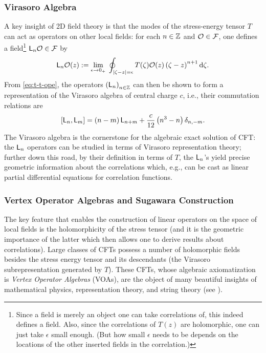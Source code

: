\documentclass[12pt,oneside,english]{amsart}
\numberwithin{equation}{section}
\numberwithin{figure}{section}
\theoremstyle{plain}
\theoremstyle{plain}
\theoremstyle{plain}
\theoremstyle{plain}
\theoremstyle{remark}
\theoremstyle{definition}
\theoremstyle{plain}
\theoremstyle{plain}
\numberwithin{thm}{section}
\begin{document}
\subsubsection{Virasoro Algebra}

A key insight of 2D field theory is that the modes of the stress-energy
tensor $T$ can act as operators on other local fields: for each $n\in\mathbb{Z} $
and ${\mathcal{O}}\in\mathcal{F}$, one defines a field\footnote{Since a field is 
merely an object one can take correlations of, this
indeed defines a field. Also, since the correlations of $T(z) $
are holomorphic, one can just take $\epsilon$ small enough. (But
how small $\epsilon$ needs to be depends on the locations of the
other inserted fields in the correlation.) } 
$\mathsf{L}_{n} {\mathcal{O}} \in \mathcal{F}$ by 
\begin{equation}
\mathsf{L}_{n}{\mathcal{O}}(z) :=
  \lim_{\epsilon \to 0_{+}} \;
  \oint_{|\zeta-z|=\epsilon}
    T(\zeta) {\mathcal{O}}(z) \left(\zeta-z\right)^{n+1} \mathrm{d}\zeta .
\label{eq:ln-def}
\end{equation}
From \eqref{eq:t-t-ope}, the operators $\left(\mathsf{L}_{n}\right)_{n\in\mathbb{Z} }$
can then be shown to form a representation of the Virasoro algebra
of central charge $c$, i.e., their commutation relations are 
\begin{equation}
\left[ \mathsf{L}_{n} , \mathsf{L}_{m} \right]
= \left(n-m\right) \mathsf{L}_{n+m}
 + \frac{c}{12}\left(n^{3}-n\right) \delta_{n,-m} .
\label{eq:virasoro-comm-rel}
\end{equation}
The Virasoro algebra is the cornerstone for the algebraic exact solution
of CFT: the $\mathsf{L}_{n}$ operators can be studied in terms of Virasoro
representation theory; further down this road, by their definition
in terms of $T$, the $\mathsf{L}_{n}$'s yield precise geometric information
about the correlations which, e.g., can be cast as linear partial differential 
equations for correlation functions.

\subsubsection{Vertex Operator Algebras and Sugawara Construction}

The key feature that enables the construction of linear operators
on the space of local fields is the holomorphicity of the stress tensor
(and it is the geometric importance of the latter which then allows
one to derive results about correlations). Large classes of CFTs possess
a number of holomorphic fields besides the stress energy tensor and
its descendants (the Virasoro subrepresentation generated by $T$). These
CFTs, whose algebraic axiomatization is \emph{Vertex Operator Algebras}
(VOAs), are the object of many beautiful insights of mathematical
physics, representation theory, and string theory 
(see \cite{borcherds,frenkel-lepwosky-meurman,kac}).
\end{document}

